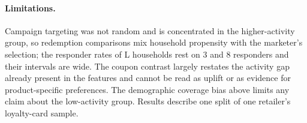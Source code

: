 \paragraph{Limitations.} Campaign targeting was not random and is concentrated in the higher-activity group, so redemption comparisons mix household propensity with the marketer's selection; the responder rates of L households rest on 3 and 8 responders and their intervals are wide. The coupon contrast largely restates the activity gap already present in the features and cannot be read as uplift or as evidence for product-specific preferences. The demographic coverage bias above limits any claim about the low-activity group. Results describe one split of one retailer's loyalty-card sample.
